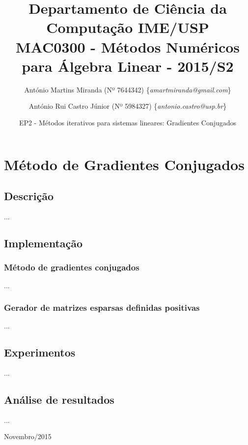\documentclass[a4paper,11pt]{article}
\begin{document}
\lstset{language=C}
\small{
  \title{
    {\small
      Departamento de Ciência da Computação \hfill IME/USP}\\\vspace{0.1in}
    MAC0300 - Métodos Numéricos para Álgebra Linear - 2015/S2
  }
  \vspace{-0.6in}
  \author{
    António Martins Miranda (Nº 7644342) \{\textit{amartmiranda@gmail.com}\} \\
    \and
    António Rui Castro Júnior (Nº 5984327) \{\textit{antonio.castro@usp.br}\}
    \vspace{-0.6in}
  }
  \date{EP2 - Métodos iterativos para sistemas lineares: Gradientes Conjugados}
  \maketitle
}
\vspace {-0.3in}
\thispagestyle{empty}

\setlength{\parindent}{5ex}

\section{Método de Gradientes Conjugados}
\subsection{Descrição}
...
\subsection{Implementação}
\subsubsection{Método de gradientes conjugados}
...
\subsubsection{Gerador de matrizes esparsas definidas positivas}
...
\subsection{Experimentos}
...
\subsection{Análise de resultados}
...

\vfill

\raggedleft
    {\sc Novembro/2015}
    
\end{document}
